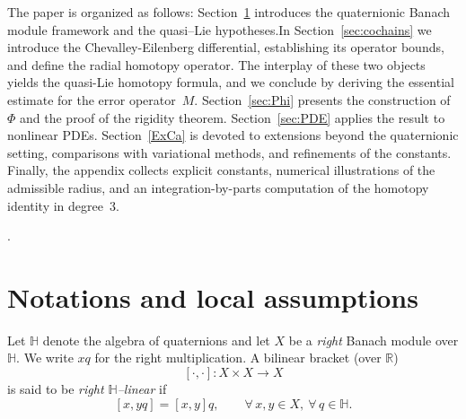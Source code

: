 \documentclass[10pt]{amsart}
\numberwithin{equation}{section}
\theoremstyle{remark}
\theoremstyle{definition}
\begin{document}
\medskip
\noindent
The paper is organized as follows: Section~\ref{sec:notations} introduces the quaternionic Banach module framework and the quasi--Lie hypotheses.In Section~\ref{sec:cochains} we introduce the Chevalley-Eilenberg differential, establishing its operator bounds, and define the radial homotopy operator. The interplay of these two objects yields the quasi-Lie homotopy formula, and we conclude by deriving the essential estimate for the error operator~$M$. Section~\ref{sec:Phi} presents the construction of~$\Phi$ and the proof of the rigidity theorem. Section~\ref{sec:PDE} applies the result to nonlinear PDEs. Section~\ref{ExCa} is devoted to extensions beyond the quaternionic setting, comparisons with variational methods, and refinements of the constants. Finally, the appendix collects explicit constants, numerical illustrations of the admissible radius, and an integration-by-parts computation of the homotopy identity in degree~3.




.


\section{Notations and local assumptions}\label{sec:notations}

Let $\mathbb H$ denote the algebra of quaternions and let $X$ be a
\emph{right} Banach module over $\mathbb H$.
We write $xq$ for the right multiplication.
A bilinear bracket (over $\mathbb R$)
\[
[\cdot,\cdot] : X \times X \to X
\]
is said to be \emph{right $\mathbb H$--linear} if
\[
[x,yq] = [x,y]q, \qquad \forall\, x,y\in X,\ \forall\, q\in\mathbb H.
\]
\end{document}
